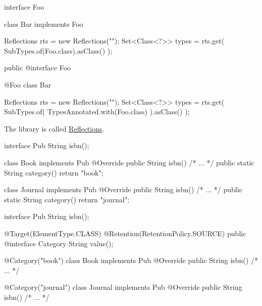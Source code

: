 \documentclass{article}
\begin{document}
\begin{pptWide}{2}
{\small\begin{ffcode}
interface Foo {}

class Bar implements Foo {}

Reflections rts =
  new Reflections("");
Set<Class<?>> types = rts.get(
  SubTypes.of(Foo.class).asClass()
);
\end{ffcode}
}
\par\columnbreak\par
{\small\begin{ffcode}
public @interface Foo {}

@Foo
class Bar {}

Reflections rts =
  new Reflections("");
Set<Class<?>> types = rts.get(
  SubTypes.of(
    TypesAnnotated.with(Foo.class)
  ).asClass()
);
\end{ffcode}
}
\end{pptWide}
\par
The library is called \href{https://github.com/ronmamo/reflections}{Reflections}.
\plush{}


\begin{pptWide}{2}
{\scriptsize\begin{ffcode}
interface Pub
  String isbn();

class Book implements Pub
  @Override public String isbn()
    /* ... */
  public static String category()
    return "book";

class Journal implements Pub
  @Override public String isbn()
    /* ... */
  public static String category()
    return "journal";
\end{ffcode}
}
\par\columnbreak\par
{\scriptsize\begin{ffcode}
interface Pub
  String isbn();

@Target(ElementType.CLASS)
@Retention(RetentionPolicy.SOURCE)
public @interface Category
  String value();

@Category("book")
class Book implements Pub
  @Override public String isbn()
    /* ... */

@Category("journal")
class Journal implements Pub
  @Override public String isbn()
    /* ... */
\end{ffcode}
}
\end{pptWide}
\par
\plush{}
\end{document}
